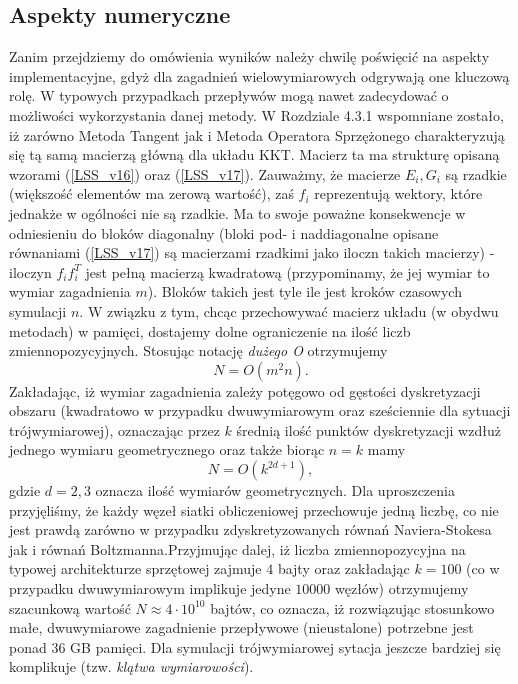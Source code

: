 \documentclass[12pt, twoside]{book}
\begin{document}
\subsection{Aspekty numeryczne}
Zanim przejdziemy do omówienia wyników należy chwilę poświęcić na aspekty implementacyjne, gdyż dla zagadnień wielowymiarowych odgrywają one kluczową rolę. W typowych przypadkach przepływów mogą nawet zadecydować o możliwości wykorzystania danej metody.\newline
W Rozdziale 4.3.1 wspomniane zostało, iż zarówno Metoda Tangent jak i Metoda Operatora Sprzężonego charakteryzują się tą samą macierzą główną dla układu KKT. Macierz ta ma strukturę opisaną wzorami (\ref{LSS_v16}) oraz (\ref{LSS_v17}). Zauważmy, że macierze $E_{i}, G_{i}$ są rzadkie (większość elementów ma zerową wartość), zaś $ f_{i} $ reprezentują wektory, które jednakże w ogólności nie są rzadkie. Ma to swoje poważne konsekwencje w odniesieniu do bloków diagonalny (bloki pod- i naddiagonalne opisane równaniami (\ref{LSS_v17}) są macierzami rzadkimi jako iloczn takich macierzy) - iloczyn $ f_{i}f_{i}^{T} $ jest  pełną macierzą kwadratową (przypominamy, że jej wymiar to wymiar zagadnienia $ m $). Bloków takich jest tyle ile jest kroków czasowych symulacji $ n $. W związku z tym, chcąc przechowywać macierz układu (w obydwu metodach) w pamięci, dostajemy dolne ograniczenie na ilość liczb zmiennopozycyjnych. Stosując notację \textit{dużego O} otrzymujemy
\begin{equation}
 N = O(m^{2}n).
\label{no}
\end{equation}
Zakładając, iż wymiar zagadnienia zależy potęgowo od gęstości dyskretyzacji obszaru (kwadratowo w przypadku dwuwymiarowym oraz sześciennie dla sytuacji trójwymiarowej), oznaczając przez $ k $ średnią ilość punktów dyskretyzacji wzdłuż jednego wymiaru geometrycznego oraz także biorąc $ n = k $ mamy
\begin{equation}
N = O(k^{2d+1}),
\label{no_v2}
\end{equation}
gdzie $ d = 2, 3$ oznacza ilość wymiarów geometrycznych. Dla uproszczenia przyjęliśmy, że każdy węzeł siatki obliczeniowej przechowuje jedną liczbę, co nie jest prawdą zarówno w przypadku zdyskretyzowanych równań Naviera-Stokesa jak i równań Boltzmanna.\newline Przyjmując dalej, iż liczba zmiennopozycyjna na typowej architekturze sprzętowej zajmuje $ 4 $ bajty oraz zakładając $ k=100 $ (co w przypadku dwuwymiarowym implikuje jedyne $ 10 000 $ węzłów) otrzymujemy szacunkową wartość $ N \approx 4\cdot 10^{10}$ bajtów, co oznacza, iż rozwiązując stosunkowo małe, dwuwymiarowe zagadnienie przepływowe (nieustalone) potrzebne jest ponad $ 36 $ GB pamięci. Dla symulacji trójwymiarowej sytacja jeszcze bardziej się komplikuje (tzw. \textit{klątwa wymiarowości}).\newline
\end{document}

